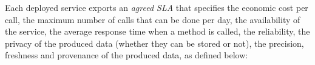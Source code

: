 
\begin{figure}
\end{figure}


Each deployed service exports an \textit{agreed SLA} that specifies the economic cost per call, the maximum number of calls that can be done per day, the availability of the service, the average response time when a method is called, the reliability, the privacy of the produced data (whether they can be stored or not), the precision, freshness and provenance of the produced data, as defined below:


